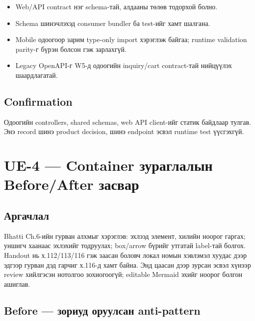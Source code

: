 \documentclass[
  mongolian,
]{article}
\providecommand{\tightlist}{%
  \setlength{\itemsep}{0pt}\setlength{\parskip}{0pt}}
\begin{document}
\begin{itemize}
\tightlist
\item
  Web/API contract нэг schema-тай, алдааны төлөв тодорхой болно.
\item
  Schema шинэчлэхэд consumer bundler ба test-ийг хамт шалгана.
\item
  Mobile одоогоор зарим type-only import хэрэглэж байгаа; runtime
  validation parity-г бүрэн болсон гэж зарлахгүй.
\item
  Legacy OpenAPI-г W5-д одоогийн inquiry/cart contract-тай нийцүүлэх
  шаардлагатай.
\end{itemize}

\subsection{Confirmation}\label{confirmation}

Одоогийн controllers, shared schemas, web API client-ийг статик байдлаар
тулгав. Энэ record шинэ product decision, шинэ endpoint эсвэл runtime
test үүсгэхгүй.

\newpage

\section{UE-4 --- Container зураглалын Before/After
засвар}\label{ue-4-container-ux437ux443ux440ux430ux433ux43bux430ux43bux44bux43d-beforeafter-ux437ux430ux441ux432ux430ux440}

\subsection{Аргачлал}\label{ux430ux440ux433ux430ux447ux43bux430ux43b}

Bhatti Ch.6-ийн гурван алхмыг хэрэглэв: эхлээд элемент, хилийн ноорог
гаргах; уншигч хаанаас эхлэхийг тодруулах; box/arrow бүрийг утгатай
label-тай болгох. Handout нь х.112/113/116 гэж заасан боловч локал номын
хэвлэмэл хуудас дээр эдгээр гурван дэд гарчиг х.116-д хамт байна. Энд
цаасан дээр зурсан эсвэл хүнээр review хийлгэсэн нотолгоо зохиогоогүй;
editable Mermaid эхийг ноорог болгон ашиглав.

\subsection{Before --- зориуд оруулсан
anti-pattern}\label{before-ux437ux43eux440ux438ux443ux434-ux43eux440ux443ux443ux43bux441ux430ux43d-anti-pattern}
\end{document}
